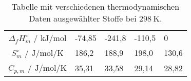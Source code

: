 \documentclass[./main.tex]{subfiles}
\begin{document}
\begin{table}[H]
    \caption{Tabelle mit verschiedenen thermodynamischen Daten ausgew\"ahlter Stoffe bei $\SI{298}{\kelvin}$.}
    \label{tab: 2025-10-3_therm. Daten2\suscode}
    \centering
    \begin{tabular}{cC{1.5cm}C{1.5cm}C{1.5cm}C{1.5cm}}
    \toprule
        &  &  &  & \\\midrule
        $\Delta_fH^{\circ}_m$ / $\si{\kilo\joule\per\mole}$ & -74,85 & -241,8 & -110,5 & 0\\
        $S^{\circ}_m$ / $\si{\joule\per\mole\per\kelvin}$ & 186,2 & 188,9 & 198,0 & 130,6\\
        $C_{p, m}$ / $\si{\joule\per\mole\per\kelvin}$ & 35,31 & 33,58 & 29,14 & 28,82\\\bottomrule
    \end{tabular}
\end{table}

\aufgabenende
\end{document}
